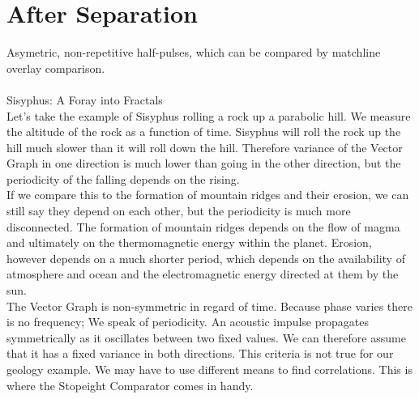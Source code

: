 \documentclass{report}
\begin{document}
\chapter{After Separation}
Asymetric, non-repetitive half-pulses, which can be compared by matchline overlay comparison.\\\\
Sisyphus: A Foray into Fractals\\
Let's take the example of Sisyphus rolling a rock up a parabolic hill. We measure the altitude of the rock as a function of time. Sisyphus will roll the rock up the hill much slower than it will roll down the hill. Therefore variance of the Vector Graph in one direction is much lower than going in the other direction, but the periodicity of the falling depends on the rising.\\
If we compare this to the formation of mountain ridges and their erosion, we can still say they depend on each other, but the periodicity is much more disconnected. The formation of mountain ridges depends on the flow of magma and ultimately on the thermomagnetic energy within the planet. Erosion, however depends on a much shorter period, which depends on the availability of atmosphere and ocean and the electromagnetic energy directed at them by the sun.\\
The Vector Graph is non-symmetric in regard of time. Because phase varies there is no frequency; We speak of periodicity. An acoustic impulse propagates symmetrically as it oscillates between two fixed values. We can therefore assume that it has a fixed variance in both directions. This criteria is not true for our geology example. We may have to use different means to find correlations. This is where the Stopeight Comparator comes in handy.\\

\iffalse
\printbibliography
\fi
{}

\end{document}
